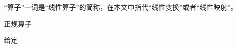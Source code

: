 




“算子”一词是“线性算子”的简称，在本文中指代“线性变换”或者“线性映射”。


\begin{definition}{正规算子}

给定

\end{definition}


































